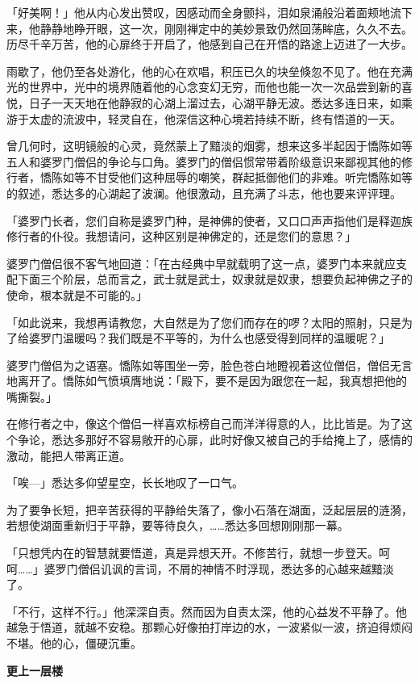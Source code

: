 \documentclass[twoside,openany]{book}
\newcommand{\mt}[1]{\textbullet \textbf{#1}}
\begin{document}
「好美啊！」他从内心发出赞叹，因感动而全身颤抖，泪如泉涌般沿着面颊地流下来，他静静地睁开眼，这一次，刚刚禅定中的美妙景致仍然回荡眸底，久久不去。历尽千辛万苦，他的心扉终于开启了，他感到自己在开悟的路途上迈进了一大步。

雨歇了，他仍至各处游化，他的心在欢唱，积压已久的块垒倏忽不见了。他在充满光的世界中，光中的境界随着他的心念变幻无穷，而他也能一次一次品尝到新的喜悦，日子一天天地在他静寂的心湖上溜过去，心湖平静无波。悉达多连日来，如乘游于太虚的流波中，轻灵自在，他深信这种心境若持续不断，终有悟道的一天。

曾几何时，这明镜般的心灵，竟然蒙上了黯淡的烟雾，想来这多半起因于憍陈如等五人和婆罗门僧侣的争论与口角。婆罗门的僧侣惯常带着阶级意识来鄙视其他的修行者，憍陈如等不甘受他们这种屈辱的嘲笑，群起抵御他们的非难。听完憍陈如等的叙述，悉达多的心湖起了波澜。他很激动，且充满了斗志，他也要来评评理。

「婆罗门长者，您们自称是婆罗门种，是神佛的使者，又口口声声指他们是释迦族修行者的仆役。我想请问，这种区别是神佛定的，还是您们的意思？」

婆罗门僧侣很不客气地回道：「在古经典中早就载明了这一点，婆罗门本来就应支配下面三个阶层，总而言之，武士就是武士，奴隶就是奴隶，想要负起神佛之子的使命，根本就是不可能的。」

「如此说来，我想再请教您，大自然是为了您们而存在的啰？太阳的照射，只是为了给婆罗门温暖吗？我们既是不平等的，为什么也感受得到同样的温暖呢？」

婆罗门僧侣为之语塞。憍陈如等围坐一旁，脸色苍白地瞪视着这位僧侣，僧侣无言地离开了。憍陈如气愤填膺地说：「殿下，要不是因为跟您在一起，我真想把他的嘴撕裂。」

在修行者之中，像这个僧侣一样喜欢标榜自己而洋洋得意的人，比比皆是。为了这个争论，悉达多那好不容易敞开的心扉，此时好像又被自己的手给掩上了，感情的激动，能把人带离正道。

「唉---」悉达多仰望星空，长长地叹了一口气。

为了要争长短，把辛苦获得的平静给失落了，像小石落在湖面，泛起层层的涟漪，若想使湖面重新归于平静，要等待良久，……悉达多回想刚刚那一幕。

「只想凭内在的智慧就要悟道，真是异想天开。不修苦行，就想一步登天。呵呵……」婆罗门僧侣讥讽的言词，不屑的神情不时浮现，悉达多的心越来越黯淡了。

「不行，这样不行。」他深深自责。然而因为自责太深，他的心益发不平静了。他越急于悟道，就越不安稳。那颗心好像拍打岸边的水，一波紧似一波，挤迫得烦闷不堪。他的心，僵硬沉重。

\mt{更上一层楼}
\end{document}
